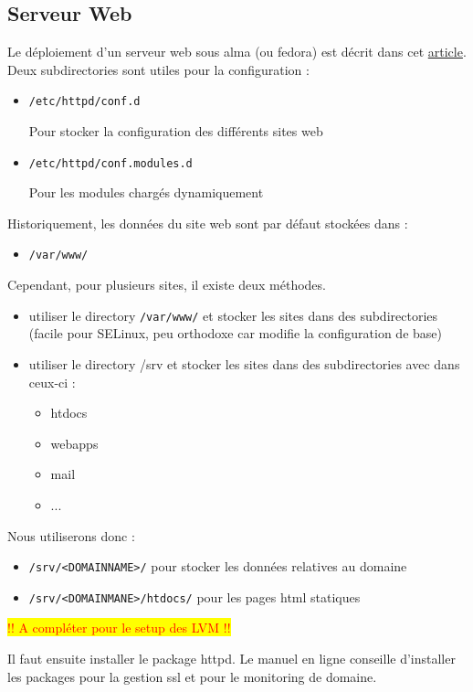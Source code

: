 \documentclass{article}
\begin{document}
	
	\subsection{Serveur Web}
	Le déploiement d'un serveur web sous alma (ou fedora) est décrit dans cet \href{https://docs.fedoraproject.org/en-US/fedora-server/services/httpd-basic-setup/}{article}.
	Deux subdirectories sont utiles pour la configuration :
	\begin{itemize}
		\item \texttt{/etc/httpd/conf.d}
		
		Pour stocker la configuration des différents sites web
		\item \texttt{/etc/httpd/conf.modules.d}
		
		Pour les modules chargés dynamiquement
	\end{itemize}
	Historiquement, les données du site web sont par défaut stockées dans :
	\begin{itemize}
		\item \texttt{/var/www/}
	\end{itemize}
	Cependant, pour plusieurs sites, il existe deux méthodes.
	\begin{itemize}
		\item utiliser  le directory \texttt{/var/www/} et stocker les sites dans des subdirectories (facile pour SELinux, peu orthodoxe car modifie la configuration de base)
		\item utiliser le directory /srv et stocker les sites dans des subdirectories avec dans ceux-ci :
		\begin{itemize}
			 \item htdocs
			 \item webapps
			 \item mail
			 \item ...
		\end{itemize}
	\end{itemize}
	Nous utiliserons donc :
	\begin{itemize}
		\item \texttt{/srv/<DOMAINNAME>/} pour stocker les données relatives au domaine
		\item  \texttt{/srv/<DOMAINMANE>/htdocs/} pour les pages html statiques
	\end{itemize}
	\colorbox{yellow}{\textcolor{red}{!! A compléter pour le setup des LVM !!}}
	
	\newpage
	
	Il faut  ensuite installer le package httpd. Le manuel en ligne conseille d'installer les packages pour la gestion ssl et pour le monitoring de domaine.
	
\end{document}
